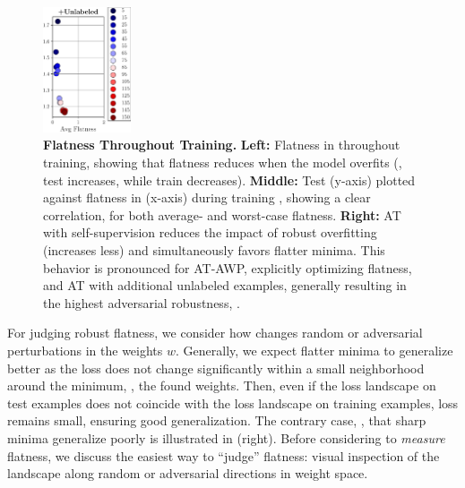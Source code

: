 \begin{figure}[t]
\begin{minipage}[t]{0.17\textwidth}
		\includegraphics[height=3.7cm]{plots_main_flatness_epochs_correlation_seq_500k}
	\end{minipage}
	\vspace*{-8px}
	\caption{\textbf{Flatness Throughout Training.} \textbf{Left:} Flatness in \RCE throughout training, showing that flatness reduces when the model overfits (\ie, {\color{plot1}test \RCE} increases, while {\color{plot0}train \RCE} decreases). 
	\textbf{Middle:} Test \RCE (y-axis) plotted against flatness in \RCE (x-axis) during training , showing a clear correlation, for both average- and worst-case flatness.
	\textbf{Right:} AT with self-supervision reduces the impact of robust overfitting (\RCE increases less) and simultaneously favors flatter minima. This behavior is pronounced for AT-AWP, explicitly optimizing flatness, and AT with additional unlabeled examples, generally resulting in the highest adversarial robustness, \cf {}.}
	\label{fig:experiments-flatness-epochs}
\end{figure}

For judging robust flatness, we consider how \RCE changes \wrt random or adversarial perturbations in the weights $w$. Generally, we expect flatter minima to generalize better as the loss does not change significantly within a small neighborhood around the minimum, \ie, the found weights. Then, even if the loss landscape on test examples does not coincide with the loss landscape on training examples, loss remains small, ensuring good generalization. The contrary case, \ie, that sharp minima generalize poorly is illustrated in  (right). Before considering to \emph{measure} flatness, we discuss the easiest way to ``judge'' flatness: visual inspection of the \RCE landscape along random or adversarial directions in weight space.

